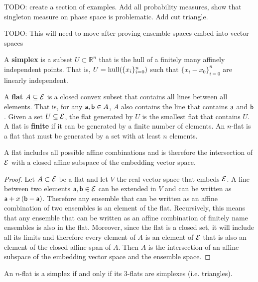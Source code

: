 TODO: create a section of examples. Add all probability measures, show that singleton measure on phase space is problematic. Add cut triangle.

TODO: This will need to move after proving ensemble spaces embed into vector spaces

\begin{defn}
	A \textbf{simplex} is a subset $U \subset \mathbb{R}^n$ that is the hull of a finitely many affinely independent points. That is, $U = \hull(\{x_i\}_{i=0}^{n})$ such that $\{x_i - x_0\}_{i=0}^{n}$ are linearly independent.
\end{defn}

\begin{defn}
	A \textbf{flat} $A \subseteq \Ens$ is a closed convex subset that contains all lines between all elements. That is, for any $\ens[a], \ens[b] \in A$, $A$ also contains the line that contains $\ens[a]$ and $\ens[b]$. Given a set $U \subseteq \Ens$, the flat generated by $U$ is the smallest flat that contains $U$. A flat is \textbf{finite} if it can be generated by a finite number of elements. An $n$-flat is a flat that must be generated by a set with at least $n$ elements.
\end{defn}

\begin{prop}
	A flat includes all possible affine combinations and is therefore the intersection of $\Ens$ with a closed affine subspace of the embedding vector space.
\end{prop}

\begin{proof}
	Let $A \subset \Ens$ be a flat and let $V$ the real vector space that embeds $\Ens$. A line between two elements $\ens[a], \ens[b] \in \Ens$ can be extended in $V$ and can be written as $\ens[a] + x \left(\ens[b] - \ens[a]\right)$. Therefore any ensemble that can be written as an affine combination of two ensembles is an element of the flat. Recursively, this means that any ensemble that can be written as an affine combination of finitely name ensembles is also in the flat. Moreover, since the flat is a closed set, it will include all its limits and therefore every element of $A$ is an element of $\Ens$ that is also an element of the closed affine span of $A$. Then $A$ is the intersection of an affine subspace of the embedding vector space and the ensemble space.
\end{proof}

\begin{conj}
	An $n$-flat is a simplex if and only if its $3$-flats are simplexes (i.e. triangles).
\end{conj}


